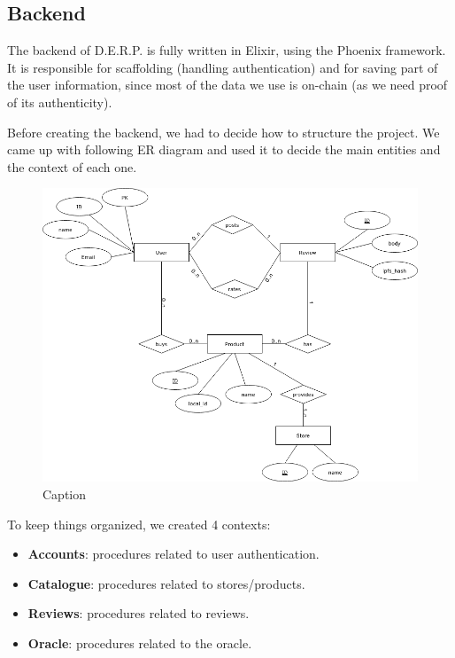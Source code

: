 \documentclass[12pt,a4paper,oneside]{article}
\theoremstyle{definition}
\begin{document}
\subsection{Backend}

The backend of D.E.R.P. is fully written in Elixir, using the Phoenix framework. It is responsible for scaffolding (handling authentication) and for saving part of the user information, since most of the data we use is on-chain (as we need proof of its authenticity). 

Before creating the backend, we had to decide how to structure the project. We came up with following ER diagram and used it to decide the main entities and the context of each one.

\begin{figure}[ht]
    \centering
    \includegraphics[scale=0.5]{figures/derp_er.drawio.png}
    \caption{Caption}
    \label{fig:my_label}
\end{figure}

To keep things organized, we created 4 contexts: 
\begin{itemize}
	\item \textbf{Accounts}: procedures related to user authentication.
	\item \textbf{Catalogue}: procedures related to stores/products.
	\item \textbf{Reviews}: procedures related to reviews.
	\item \textbf{Oracle}: procedures related to the oracle.
\end{itemize}
\end{document}
